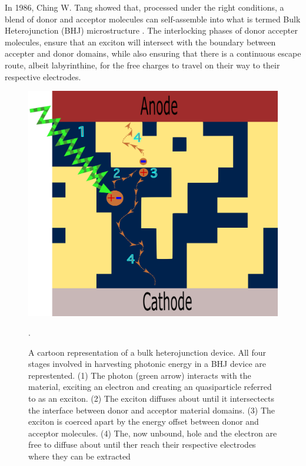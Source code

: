 In 1986, Ching W. Tang
showed that, processed under the right conditions, a blend of donor and acceptor molecules can self-assemble
into what is termed Bulk Heterojunction (BHJ) microstructure \cite{Tang1986c}. 
The interlocking phases of donor accepter molecules, ensure
that an exciton will intersect with the boundary between accepter and donor domains, while also ensuring that
there
is a continuous escape route, albeit labyrinthine, for the free charges to travel on their way to their respective
electrodes. 

\begin{figure}
    \center
    \includegraphics[width = .6\textwidth]{figures/BHJ-figure.png}
    \caption{A cartoon representation of a bulk heterojunction device. All four stages involved in harvesting
    photonic energy in a BHJ device are represtented. (1) The photon (green arrow) interacts with the material,
    exciting an electron and creating an quasiparticle referred to as an exciton. (2) The exciton diffuses
    about until it intersectects the interface between donor and acceptor material domains. (3) The exciton is
    coerced apart by the energy offset between donor and acceptor molecules. 
    (4) The, now unbound,  hole and the electron are free to diffuse about until ther reach their respective
    electrodes where they can be extracted \cite{Fusella2019}}.
    \label{bhj}
\end{figure}


